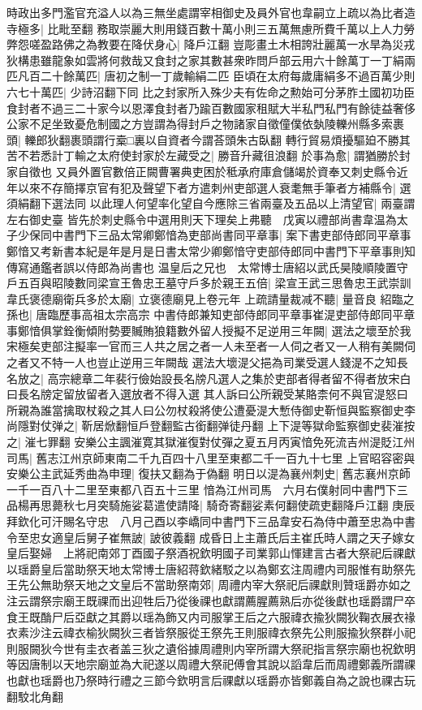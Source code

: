時政出多門濫官充溢人以為三無坐處謂宰相御史及員外官也韋嗣立上疏以為比者造寺極多|{
	比毗至翻}
務取崇麗大則用錢百數十萬小則三五萬無慮所費千萬以上人力勞弊怨嗟盈路佛之為教要在降伏身心|{
	降戶江翻}
豈彫畫土木相誇壯麗萬一水旱為災戎狄構患雖龍象如雲將何救哉又食封之家其數甚衆昨問戶部云用六十餘萬丁一丁絹兩匹凡百二十餘萬匹|{
	唐初之制一丁歲輸絹二匹}
臣頃在太府每歲庸絹多不過百萬少則六七十萬匹|{
	少詩沼翻下同}
比之封家所入殊少夫有佐命之勲始可分茅胙土國初功臣食封者不過三二十家今以恩澤食封者乃踰百數國家租賦大半私門私門有餘徒益奢侈公家不足坐致憂危制國之方豈謂為得封戶之物諸家自徵僮僕依埶陵轢州縣多索裹頭|{
	轢郎狄翻裹頭謂行槖□裏以自資者今謂荅頭朱古臥翻}
轉行貿易煩擾驅廹不勝其苦不若悉計丁輸之太府使封家於左藏受之|{
	勝音升藏徂浪翻}
於事為愈|{
	謂猶勝於封家自徵也}
又員外置官數倍正闕曹署典吏困於秪承府庫倉儲竭於資奉又刺史縣令近年以來不存簡擇京官有犯及聲望下者方遣刺州吏部選人衰耄無手筆者方補縣令|{
	選須絹翻下選法同}
以此理人何望率化望自今應除三省兩臺及五品以上清望官|{
	兩臺謂左右御史臺}
皆先於刺史縣令中選用則天下理矣上弗聽　戊寅以禮部尚書韋温為太子少保同中書門下三品太常卿鄭愔為吏部尚書同平章事|{
	案下書吏部侍郎同平章事鄭愔又考新書本紀是年是月是日書太常少卿鄭愔守吏部侍郎同中書門下平章事則知傳寫通鑑者誤以侍郎為尚書也}
温皇后之兄也　太常博士唐紹以武氏昊陵順陵置守戶五百與昭陵數同梁宣王魯忠王墓守戶多於親王五倍|{
	梁宣王武三思魯忠王武崇訓}
韋氏褒德廟衛兵多於太廟|{
	立褒德廟見上卷元年}
上疏請量裁减不聽|{
	量音良}
紹臨之孫也|{
	唐臨歷事高祖太宗高宗}
中書侍郎兼知吏部侍郎同平章事崔湜吏部侍郎同平章事鄭愔俱掌銓衡傾附勢要贓賄狼籍數外留人授擬不足逆用三年闕|{
	選法之壞至於我宋極矣吏部注擬率一官而三人共之居之者一人未至者一人伺之者又一人稍有美闕伺之者又不特一人也豈止逆用三年闕哉}
選法大壞湜父挹為司業受選人錢湜不之知長名放之|{
	高宗總章二年裴行儉始設長名牓凡選人之集於吏部者得者留不得者放宋白曰長名牓定留放留者入選放者不得入選}
其人訴曰公所親受某賂柰何不與官湜怒曰所親為誰當擒取杖殺之其人曰公勿杖殺將使公遭憂湜大慙侍御史靳恒與監察御史李尚隱對仗弹之|{
	靳居焮翻恒戶登翻監古銜翻弹徒丹翻}
上下湜等獄命監察御史裴漼按之|{
	漼七罪翻}
安樂公主諷漼寛其獄漼復對仗彈之夏五月丙寅愔免死流吉州湜貶江州司馬|{
	舊志江州京師東南二千九百四十八里至東都二千一百九十七里}
上官昭容密與安樂公主武延秀曲為申理|{
	復扶又翻為于偽翻}
明日以湜為襄州刺史|{
	舊志襄州京師一千一百八十二里至東都八百五十三里}
愔為江州司馬　六月右僕射同中書門下三品楊再思薨秋七月突騎施娑葛遣使請降|{
	騎奇寄翻娑素何翻使疏吏翻降戶江翻}
庚辰拜欽化可汗賜名守忠　八月己酉以李嶠同中書門下三品韋安石為侍中蕭至忠為中書令至忠女適皇后舅子崔無詖|{
	詖彼義翻}
成昏日上主蕭氏后主崔氏時人謂之天子嫁女皇后娶婦　上將祀南郊丁酉國子祭酒祝欽明國子司業郭山惲建言古者大祭祀后祼獻以瑶爵皇后當助祭天地太常博士唐紹蒋欽緒駁之以為鄭玄注周禮内司服惟有助祭先王先公無助祭天地之文皇后不當助祭南郊|{
	周禮内宰大祭祀后祼獻則贊瑶爵亦如之注云謂祭宗廟王既祼而出迎牲后乃從後祼也獻謂薦腥薦熟后亦從後獻也瑶爵謂尸卒食王既酳尸后亞獻之其爵以瑶為飾又内司服掌王后之六服禕衣揄狄闕狄鞠衣展衣禒衣素沙注云禕衣榆狄闕狄三者皆祭服從王祭先王則服禕衣祭先公則服揄狄祭群小祀則服闕狄今世有圭衣者盖三狄之遺俗據周禮則内宰所謂大祭祀指言祭宗廟也祝欽明等因唐制以天地宗廟並為大祀遂以周禮大祭祀傅會其說以謟韋后而周禮鄭義所謂祼也獻也瑶爵也乃祭時行禮之三節今欽明言后祼獻以瑶爵亦皆鄭義自為之說也祼古玩翻駮北角翻}
